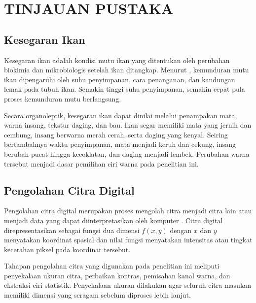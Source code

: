 \chapter{TINJAUAN PUSTAKA}
\label{chap:tinjauanpustaka}

\section{Kesegaran Ikan}

Kesegaran ikan adalah kondisi mutu ikan yang ditentukan oleh perubahan
biokimia dan mikrobiologis setelah ikan ditangkap. Menurut
\citet{estiasih2015}, kemunduran mutu ikan dipengaruhi oleh suhu
penyimpanan, cara penanganan, dan kandungan lemak pada tubuh ikan.
Semakin tinggi suhu penyimpanan, semakin cepat pula proses kemunduran
mutu berlangsung.

Secara organoleptik, kesegaran ikan dapat dinilai melalui penampakan
mata, warna insang, tekstur daging, dan bau. Ikan segar memiliki mata
yang jernih dan cembung, insang berwarna merah cerah, serta daging yang
kenyal. Seiring bertambahnya waktu penyimpanan, mata menjadi keruh dan
cekung, insang berubah pucat hingga kecoklatan, dan daging menjadi
lembek. Perubahan warna tersebut menjadi dasar pemilihan ciri warna
pada penelitian ini.

\section{Pengolahan Citra Digital}

Pengolahan citra digital merupakan proses mengolah citra menjadi citra
lain atau menjadi data yang dapat diinterpretasikan oleh komputer
\citep{gonzalez2018}. Citra digital direpresentasikan sebagai fungsi
dua dimensi $f(x,y)$ dengan $x$ dan $y$ menyatakan koordinat spasial
dan nilai fungsi menyatakan intensitas atau tingkat kecerahan piksel
pada koordinat tersebut.

Tahapan pengolahan citra yang digunakan pada penelitian ini meliputi
penyekalaan ukuran citra, perbaikan kontras, pemisahan kanal warna, dan
ekstraksi ciri statistik. Penyekalaan ukuran dilakukan agar seluruh
citra masukan memiliki dimensi yang seragam sebelum diproses lebih
lanjut.

